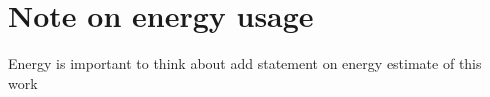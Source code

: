 
\chapter{Note on energy usage}



Energy is important to think about
add statement on energy estimate of this work 


